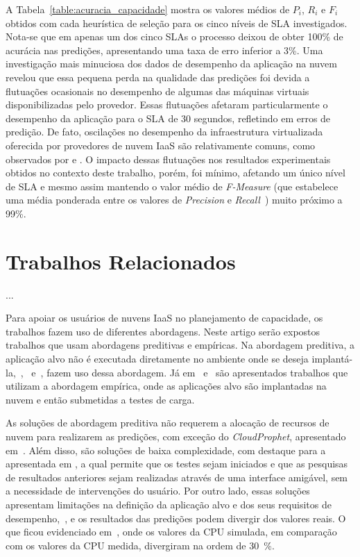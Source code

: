 \documentclass[12pt]{article}
\begin{document}
A Tabela~\ref{table:acuracia_capacidade} mostra os valores médios de $P_{i}$, $R_{i}$ e $F_{i}$ obtidos com cada heurística de seleção para os cinco níveis de SLA investigados. Nota-se que em apenas um dos cinco SLAs o processo deixou de obter 100\% de acurácia nas predições, apresentando uma taxa de erro inferior a 3\%. Uma investigação mais minuciosa dos dados de desempenho da aplicação na nuvem revelou que essa pequena perda na qualidade das predições foi devida a flutuações ocasionais no desempenho de algumas das máquinas virtuais disponibilizadas pelo provedor. Essas flutuações afetaram particularmente o desempenho da aplicação para o SLA de 30 segundos, refletindo em erros de predição. De fato, oscilações no desempenho da infraestrutura virtualizada oferecida por provedores de nuvem IaaS são relativamente comuns, como observados por \cite{iosup2011performance} e \cite{cunha2011investigating}. O impacto dessas flutuações nos resultados experimentais obtidos no contexto deste trabalho, porém, foi mínimo, afetando um único nível de SLA e mesmo assim mantendo o valor médio de \emph{F-Measure} (que estabelece uma média ponderada entre os valores de \emph{Precision} e \emph{Recall}~\cite{Baeza-Yates1999}) muito próximo a 99\%.


\section{Trabalhos Relacionados}\label{sec:related-work}

...


Para apoiar os usuários de nuvens IaaS no planejamento de capacidade, os trabalhos fazem uso de diferentes abordagens. Neste artigo serão expostos trabalhos que usam abordagens preditivas e empíricas. Na abordagem preditiva, a
aplicação alvo não é executada diretamente no ambiente onde se deseja implantá-la,~\cite{cloudharmony},~\cite{malkowski2010cloudxplor,li2011,jung2013cloudadvisor,fittkau2012cdosim} e~\cite{li2011cloudprophet}, fazem uso dessa abordagem. Já em~\cite{jayasinghe2012,silva2013cloudbench,cunhacloud} e~\cite{scheuner2014cloud} são apresentados trabalhos que utilizam a abordagem empírica, onde as aplicações alvo são implantadas na nuvem e então
submetidas a testes de carga.

As soluções de abordagem preditiva não requerem a alocação de recursos de nuvem para realizarem as predições, com
exceção do \textit{CloudProphet}, apresentado em~\cite{li2011cloudprophet}. Além disso, são soluções de baixa complexidade, com destaque para a apresentada em \cite{cloudharmony}, a qual permite que os testes sejam iniciados e que as pesquisas de resultados anteriores sejam realizadas através de uma interface amigável, sem a necessidade de intervenções do usuário. Por outro lado, essas soluções apresentam limitações na definição da aplicação alvo e dos
seus requisitos de desempenho,~\cite{malkowski2010cloudxplor,cloudharmony}, e os resultados das predições podem divergir dos valores reais. O que ficou evidenciado em~\cite{fittkau2012cdosim}, onde os valores da CPU simulada, em comparação com os valores da CPU medida, divergiram na ordem de 30~\%.
\end{document}
